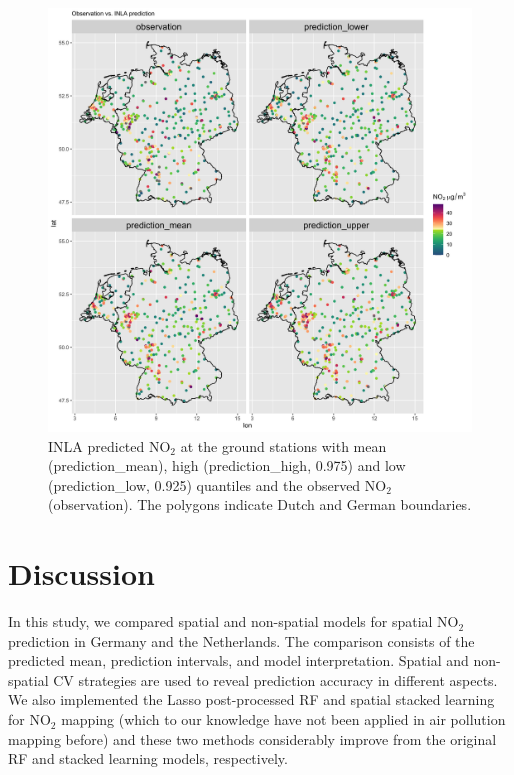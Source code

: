 \documentclass{article}
\begin{document}
\begin{figure}
\centering
\includegraphics[scale =0.1]{fig/pred_11var.png}
\caption{INLA predicted NO$_2$ at the ground stations with mean (prediction\_mean), high (prediction\_high, 0.975) and low (prediction\_low, 0.925) quantiles and the observed NO$_2$ (observation). The polygons indicate Dutch and German boundaries.}
\label{INLApred}
\end{figure}


\section{Discussion}
In this study, we compared spatial and non-spatial models for spatial NO$_2$ prediction in Germany and the Netherlands. The comparison consists of the predicted mean, prediction intervals, and model interpretation. Spatial and non-spatial CV strategies are used to reveal prediction accuracy in different aspects. We also implemented the Lasso post-processed RF and spatial stacked learning for NO$_2$ mapping (which to our knowledge have not been applied in air pollution mapping before) and these two methods considerably improve from the original RF and stacked learning models, respectively. %
\end{document}
